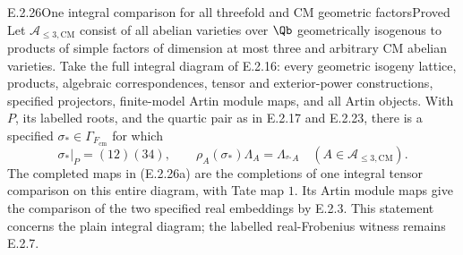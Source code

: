 \begin{result}{E.2.26}{One integral comparison for all threefold and CM geometric factors}{Proved}
Let \(\mathcal A_{\leq3,\mathrm{CM}}\) consist of all abelian varieties
over \(\Qb\) geometrically isogenous to products of simple factors of
dimension at most three and arbitrary CM abelian varieties. Take the
full integral diagram of E.2.16: every geometric isogeny lattice,
products, algebraic correspondences, tensor and exterior-power
constructions, specified projectors, finite-model Artin module maps,
and all Artin objects. With \(P\), its labelled roots, and the quartic
pair as in E.2.17 and E.2.23, there is a specified
\(\sigma_*\in\Gamma_{F_{\mathrm{cm}}}\) for which
\[
 \sigma_*|_P=(12)(34),\qquad
 \rho_A(\sigma_*)\Lambda_A=\Lambda_{{}^{\sigma_*}A}
       \quad(A\in\mathcal A_{\leq3,\mathrm{CM}}).
 \tag{E.2.26a}
\]
The completed maps in (E.2.26a) are the completions of one integral
tensor comparison on this entire diagram, with Tate map \(1\).
Its Artin module maps give the comparison of the two specified real
embeddings by E.2.3. This statement concerns the plain integral
diagram; the labelled real-Frobenius witness remains E.2.7.
\end{result}
